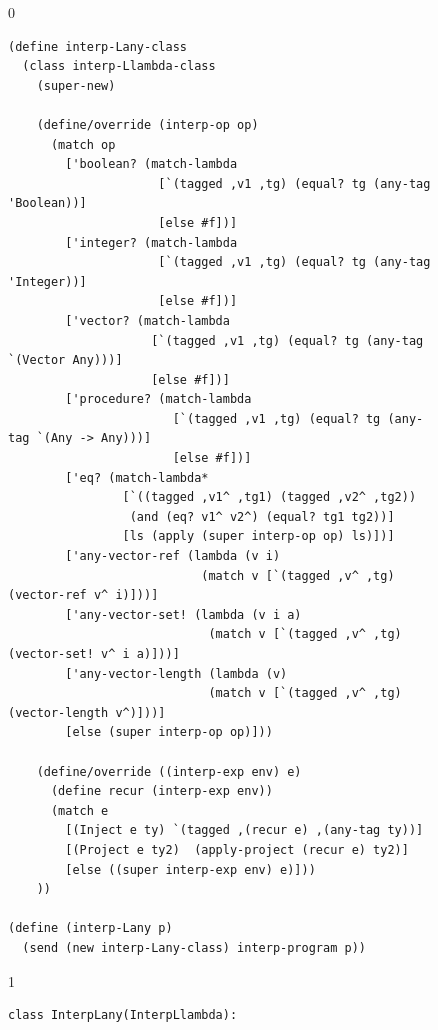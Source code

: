 \documentclass[7x10]{TimesAPriori_MIT}%
\def\racketEd{0}
\def\pythonEd{1}
\def\edition{1}
\newcommand{\pythonColor}[0]{}
\numberwithin{theorem}{chapter}
\numberwithin{definition}{chapter}
\numberwithin{equation}{chapter}
\begin{document}
\begin{figure}[btp]
  \begin{tcolorbox}[colback=white]
{\if\edition\racketEd
\begin{lstlisting}[basicstyle=\ttfamily\footnotesize]
(define interp-Lany-class
  (class interp-Llambda-class
    (super-new)

    (define/override (interp-op op)
      (match op
        ['boolean? (match-lambda
                     [`(tagged ,v1 ,tg) (equal? tg (any-tag 'Boolean))]
                     [else #f])]
        ['integer? (match-lambda
                     [`(tagged ,v1 ,tg) (equal? tg (any-tag 'Integer))]
                     [else #f])]
        ['vector? (match-lambda
                    [`(tagged ,v1 ,tg) (equal? tg (any-tag `(Vector Any)))]
                    [else #f])]
        ['procedure? (match-lambda
                       [`(tagged ,v1 ,tg) (equal? tg (any-tag `(Any -> Any)))]
                       [else #f])]
        ['eq? (match-lambda*
                [`((tagged ,v1^ ,tg1) (tagged ,v2^ ,tg2))
                 (and (eq? v1^ v2^) (equal? tg1 tg2))]
                [ls (apply (super interp-op op) ls)])]
        ['any-vector-ref (lambda (v i)
                           (match v [`(tagged ,v^ ,tg) (vector-ref v^ i)]))]
        ['any-vector-set! (lambda (v i a)
                            (match v [`(tagged ,v^ ,tg) (vector-set! v^ i a)]))]
        ['any-vector-length (lambda (v)
                            (match v [`(tagged ,v^ ,tg) (vector-length v^)]))]
        [else (super interp-op op)]))

    (define/override ((interp-exp env) e)
      (define recur (interp-exp env))
      (match e
        [(Inject e ty) `(tagged ,(recur e) ,(any-tag ty))]
        [(Project e ty2)  (apply-project (recur e) ty2)]
        [else ((super interp-exp env) e)]))
    ))

(define (interp-Lany p)
  (send (new interp-Lany-class) interp-program p))
\end{lstlisting}
\fi}
{\if\edition\pythonEd\pythonColor
\begin{lstlisting}[basicstyle=\ttfamily\footnotesize]
class InterpLany(InterpLlambda):


\end{lstlisting}}
\end{tcolorbox}
\end{figure}
\end{document}
